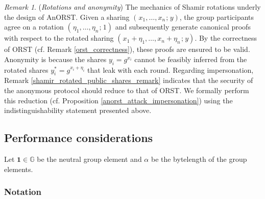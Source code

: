 \documentclass[psamsfonts, reqno]{amsart}
\theoremstyle{definition}
\theoremstyle{remark}
\newtheorem{rem}[thm]{Remark}
\numberwithin{equation}{section}
\begin{document}
\begin{rem}\label{shamir_rotations_and_anonymity}
(\textit{Rotations and anonymity})
The mechanics of Shamir rotations underly the design
of \textsf{AnORST}. Given a sharing
$(\hspace{1pt}x_1, \dots, x_n\hspace{1pt};\hspace{1pt} y)$,
the group participants agree
on a rotation
$(\hspace{1pt}\eta_1, \dots, \eta_n\hspace{1pt};\hspace{1pt} 1)$
and subsequently generate canonical proofs with respect to
the rotated sharing
$(\hspace{1pt}x_1 + \eta_1, \dots, x_n + \eta_n\hspace{1pt};\hspace{1pt} y)$.
By the correctness of \textsf{ORST}
(cf. Remark \ref{orst_correctness}),
these proofs are ensured to be valid.
Anonymity is because the shares
$y_i = g ^ {x_i}$ cannot be feasibly
inferred from the rotated shares
$y^*_i = g ^ {x_i + \eta_i}$
that leak with each round.
Regarding impersonation,
Remark \ref{shamir_rotated_public_shares_remark}
indicates that the security of the anonymous protocol
should reduce to that of \textsf{ORST}.
We formally perform this reduction
(cf. Proposition \ref{anorst_attack_impersonation})
using the indistinguishability statement presented above.
\end{rem}

\subsection{Performance considerations}\label{section_operational_considerations}

Let $\mathbf{1} \in \mathbb{G}$ be the neutral group element
and $\alpha$ be the bytelength of the group elements.

\subsubsection{Notation}
\end{document}
